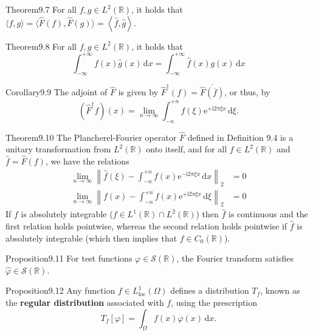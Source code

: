 \begin{res}[Parseval]{Theorem}{9.7}
For all $f,g\in L^2(\mathbb R)$, it holds that $\langle f,g\rangle=\langle\hat F(f),\hat F(g)\rangle=\left\langle\widehat f,\widehat g\right\rangle$.
\end{res}

\begin{res}{Theorem}{9.8}
For all $f,g\in L^2(\mathbb R)$, it holds that
\begin{equation}\int_{-\infty}^{+\infty}f(x)\widehat g(x)\,\mathrm dx=\int_{-\infty}^{+\infty}\widehat f(x)g(x)\,\mathrm dx\tag{9.20}\end{equation}
\end{res}

\begin{res}{Corollary}{9.9}
The adjoint of $\hat F$ is given by $\hat F^\dagger(f)=\overline{\hat F(\overline f)}$, or thus, by
\begin{equation}(\hat F^\dagger f)(x)=\lim_{n\to\infty}\int_{-n}^{+n}f(\xi)\mathrm e^{+\mathrm i2\pi\xi x}\,\mathrm d\xi.\tag{9.21}\end{equation}
\end{res}

\begin{res}{Theorem}{9.10}
The Plancherel-Fourier operator $\hat F$ defined in Definition 9.4 is a unitary transformation from $L^2(\mathbb R)$ onto itself, and for all $f\in L^2(\mathbb R)$ and $\widehat f=\hat F(f)$, we have the relations
\begin{align}
\lim_{n\to\infty}\left\|\widehat f(\xi)-\int_{-n}^{+n}f(x)\mathrm e^{-\mathrm i2\pi\xi x}\,\mathrm dx\right\|_2&=0\tag{9.22}\\
\lim_{n\to\infty}\left\|f(x)-\int_{-n}^{+n}f(x)\mathrm e^{+\mathrm i2\pi\xi x}\,\mathrm d\xi\right\|_2&=0\tag{9.23}
\end{align}
If $f$ is absolutely integrable ($f\in L^1(\mathbb R)\cap L^2(\mathbb R)$) then $\widehat f$ is continuous and the first relation holds pointwise, whereas the second relation holds pointwise if $\widehat f$ is absolutely integrable (which then implies that $f\in C_0(\mathbb R)$).
\end{res}

\begin{res}{Proposition}{9.11}
For test functions $\varphi\in\mathcal S(\mathbb R)$, the Fourier transform satisfies $\widehat\varphi\in\mathcal S(\mathbb R)$.
\end{res}

\begin{res}{Proposition}{9.12}
Any function $f\in L^1_{\mathrm{loc}}(\Omega)$ defines a distribution $T_f$, known as the \textbf{regular distribution} associated with $f$, using the prescription
\begin{equation}T_f[\varphi]=\int_\Omega f(x)\varphi(x)\,\mathrm dx.\tag{9.40}\end{equation}
\end{res}

